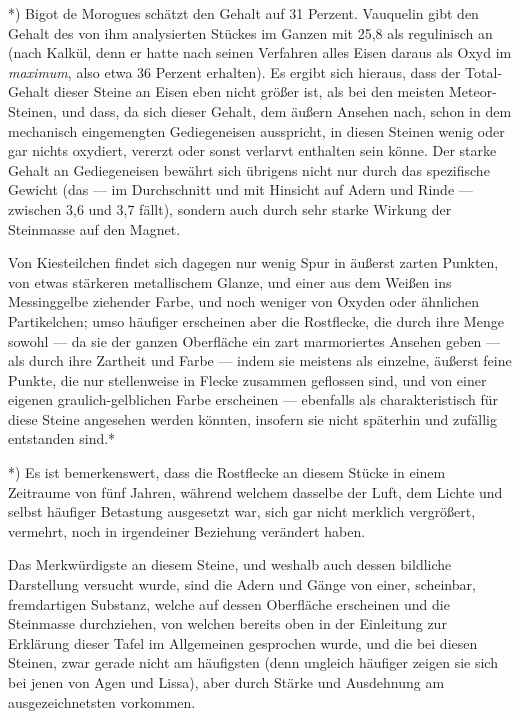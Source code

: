 \documentclass[a4paper, 11pt, oneside, german]{article}
\begin{document}
*) Bigot de Morogues schätzt den Gehalt auf 31 Perzent. Vauquelin gibt den Gehalt des von ihm analysierten Stückes im Ganzen mit 25,8 als regulinisch an (nach Kalkül, denn er hatte nach seinen Verfahren alles Eisen daraus als Oxyd im \emph{maximum}, also etwa 36 Perzent erhalten). Es ergibt sich hieraus, dass der Total-Gehalt dieser Steine an Eisen eben nicht größer ist, als bei den meisten Meteor-Steinen, und dass, da sich dieser Gehalt, dem äußern Ansehen nach, schon in dem mechanisch eingemengten Gediegeneisen ausspricht, in diesen Steinen wenig oder gar nichts oxydiert, vererzt oder sonst verlarvt enthalten sein könne. Der starke Gehalt an Gediegeneisen bewährt sich übrigens nicht nur durch das spezifische Gewicht (das --- im Durchschnitt und mit Hinsicht auf Adern und Rinde --- zwischen 3,6 und 3,7 fällt), sondern auch durch sehr starke Wirkung der Steinmasse auf den Magnet.

Von Kiesteilchen findet sich dagegen nur wenig Spur in äußerst zarten Punkten, von etwas stärkeren metallischem Glanze, und einer aus dem Weißen ins Messinggelbe ziehender Farbe, und noch weniger von Oxyden oder ähnlichen Partikelchen; umso häufiger erscheinen aber die Rostflecke, die durch ihre Menge sowohl --- da sie der ganzen Oberfläche ein zart marmoriertes Ansehen geben --- als durch ihre Zartheit und Farbe --- indem sie meistens als einzelne, äußerst feine Punkte, die nur stellenweise in Flecke zusammen geflossen sind, und von einer eigenen graulich-gelblichen Farbe erscheinen --- ebenfalls als charakteristisch für diese Steine angesehen werden könnten, insofern sie nicht späterhin und zufällig entstanden sind.*

*) Es ist bemerkenswert, dass die Rostflecke an diesem Stücke in einem Zeitraume von fünf Jahren, während welchem dasselbe der Luft, dem Lichte und selbst häufiger Betastung ausgesetzt war, sich gar nicht merklich vergrößert, vermehrt, noch in irgendeiner Beziehung verändert haben.

Das Merkwürdigste an diesem Steine, und weshalb auch dessen bildliche Darstellung versucht wurde, sind die Adern und Gänge von einer, scheinbar, fremdartigen Substanz, welche auf dessen Oberfläche erscheinen und die Steinmasse durchziehen, von welchen bereits oben in der Einleitung zur Erklärung dieser Tafel im Allgemeinen gesprochen wurde, und die bei diesen Steinen, zwar gerade nicht am häufigsten (denn ungleich häufiger zeigen sie sich bei jenen von Agen und Lissa), aber durch Stärke und Ausdehnung am ausgezeichnetsten vorkommen.
\end{document}
